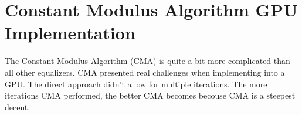 %


\section{Constant Modulus Algorithm GPU Implementation}
The Constant Modulus Algorithm (CMA) is quite a bit more complicated than all other equalizers.
CMA presented real challenges when implementing into a GPU.
The direct approach didn't allow for multiple iterations.
The more iterations CMA performed, the better CMA becomes becouse CMA is a steepest decent.

